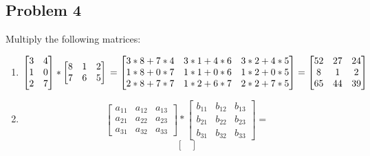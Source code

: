 \documentclass[12pt,letterpaper]{article}
\begin{document}
\begin{itemize}
      \section*{Problem 4}
      Multiply the following matrices:
      \begin{enumerate}
            \item \[
                  \begin{bmatrix}
                        3 & 4\\
                        1 & 0\\
                        2 & 7
                      \end{bmatrix}*
                  \begin{bmatrix}
                  8 & 1 & 2\\
                  7 & 6 & 5
                  \end{bmatrix}\\
                  =\begin{bmatrix}
                        3*8+7*4 & 3*1+4*6 & 3*2+ 4*5\\
                        1*8+0*7 & 1*1+0*6 & 1*2+ 0*5\\
                        2*8+7*7 & 1*2+6*7 & 2*2+ 7*5
                  \end{bmatrix}
                  =\begin{bmatrix}
                        52 & 27 & 24\\
                        8 & 1 & 2\\
                        65 & 44 & 39
                  \end{bmatrix}
                  \] 
            \item \[
                  \begin{bmatrix}
                        a_{11} & a_{12} & a_{13}\\
                        a_{21} & a_{22} & a_{23}\\
                        a_{31} & a_{32} & a_{33}
                      \end{bmatrix}*
                      \begin{bmatrix}
                        b_{11} & b_{12} & b_{13}\\
                        b_{21} & b_{22} & b_{23}\\
                        b_{31} & b_{32} & b_{33}
                      \end{bmatrix}=
                  \] 
                  \[
                  \begin{bmatrix}

\end{bmatrix}\]
\end{enumerate}
\end{itemize}
\end{document}
